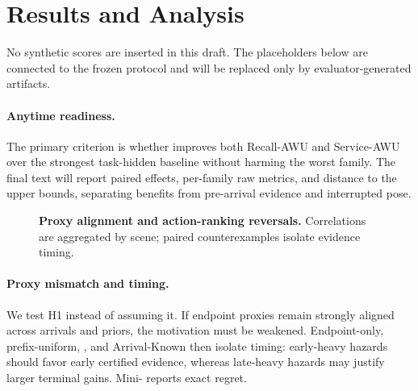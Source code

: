 \section{Results and Analysis}
\label{sec:results}

No synthetic scores are inserted in this draft.
The placeholders below are connected to the frozen protocol and will be replaced only by evaluator-generated artifacts.

\begin{table}[t]
  \centering
  \caption{\textbf{Primary unseen-scene results.}
  Task-hidden methods share the embodied stack; task-known and oracle variants are separated.
  Report mean and 95\% hierarchical-bootstrap confidence intervals over at least five seeds.}
  \label{tab:main}
\end{table}

\paragraph{Anytime readiness.}
The primary criterion is whether \method{} improves both Recall-AWU and Service-AWU over the strongest task-hidden baseline without harming the worst family.
The final text will report paired effects, per-family raw metrics, and distance to the upper bounds, separating benefits from pre-arrival evidence and interrupted pose.

\begin{figure}[t]
  \centering
  \caption{\textbf{Proxy alignment and action-ranking reversals.}
  Correlations are aggregated by scene; paired counterexamples isolate evidence timing.}
  \label{fig:proxy}
\end{figure}

\paragraph{Proxy mismatch and timing.}
We test H1 instead of assuming it.
If endpoint proxies remain strongly aligned across arrivals and priors, the motivation must be weakened.
Endpoint-only, prefix-uniform, \method{}, and Arrival-Known then isolate timing:
early-heavy hazards should favor early certified evidence, whereas late-heavy hazards may justify larger terminal gains.
Mini-\taskname{} reports exact regret.

